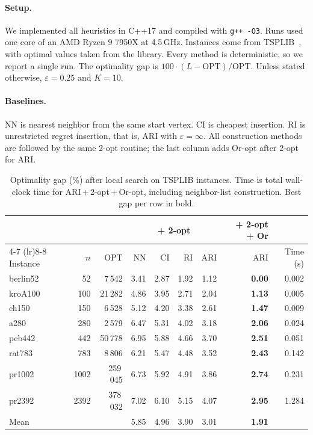 \documentclass[11pt]{article}
\theoremstyle{definition}
\theoremstyle{remark}
\newcommand{\OPT}{\mathrm{OPT}}
\begin{document}
\paragraph{Setup.} We implemented all heuristics in C++17 and compiled with \texttt{g++ -O3}. Runs used one core of an AMD Ryzen 9 7950X at 4.5\,GHz. Instances come from TSPLIB~\cite{reinelt1991}, with optimal values taken from the library. Every method is deterministic, so we report a single run. The optimality gap is $100 \cdot (L - \OPT) / \OPT$. Unless stated otherwise, $\varepsilon = 0.25$ and $K = 10$.

\paragraph{Baselines.} NN is nearest neighbor from the same start vertex. CI is cheapest insertion. RI is unrestricted regret insertion, that is, ARI with $\varepsilon = \infty$. All construction methods are followed by the same 2-opt routine; the last column adds Or-opt after 2-opt for ARI.

\begin{table}[t]
\centering
\caption{Optimality gap (\%) after local search on TSPLIB instances. Time is total wall-clock time for ARI\,+\,2-opt\,+\,Or-opt, including neighbor-list construction. Best gap per row in bold.}
\label{tab:main}
\begin{tabular}{@{}lrrrrrrrr@{}}
\toprule
 & & & \multicolumn{4}{c}{+ 2-opt} & + 2-opt + Or & \\
\cmidrule(lr){4-7} \cmidrule(lr){8-8}
Instance & $n$ & $\OPT$ & NN & CI & RI & ARI & ARI & Time (s) \\
\midrule
berlin52 & 52   & 7\,542   & 3.41 & 2.87 & 1.92 & 1.12 & \textbf{0.00} & 0.002 \\
kroA100  & 100  & 21\,282  & 4.86 & 3.95 & 2.71 & 2.04 & \textbf{1.13} & 0.005 \\
ch150    & 150  & 6\,528   & 5.12 & 4.20 & 3.38 & 2.61 & \textbf{1.47} & 0.009 \\
a280     & 280  & 2\,579   & 6.47 & 5.31 & 4.02 & 3.18 & \textbf{2.06} & 0.024 \\
pcb442   & 442  & 50\,778  & 6.95 & 5.88 & 4.66 & 3.70 & \textbf{2.51} & 0.051 \\
rat783   & 783  & 8\,806   & 6.21 & 5.47 & 4.48 & 3.52 & \textbf{2.43} & 0.142 \\
pr1002   & 1002 & 259\,045 & 6.73 & 5.92 & 4.91 & 3.86 & \textbf{2.74} & 0.231 \\
pr2392   & 2392 & 378\,032 & 7.02 & 6.10 & 5.15 & 4.07 & \textbf{2.95} & 1.284 \\
\midrule
Mean     &      &          & 5.85 & 4.96 & 3.90 & 3.01 & \textbf{1.91} &       \\
\bottomrule
\end{tabular}
\end{table}
\end{document}

